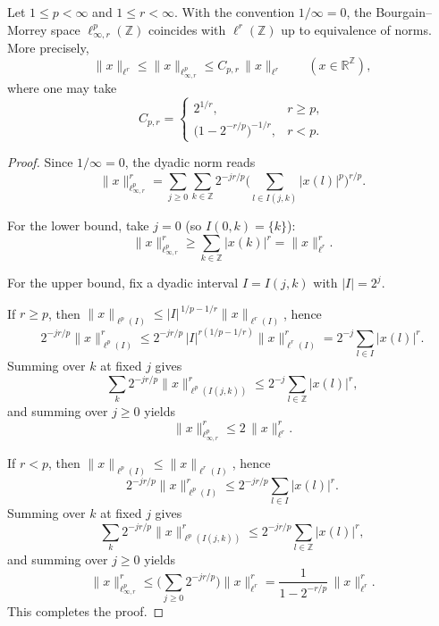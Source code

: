 \documentclass[10pt,a4paper]{amsart}
\begin{document}
\begin{proposition}[The case $q=\infty$]\label{prop:q_infty}
Let $1\le p<\infty$ and $1\le r<\infty$. With the convention $1/\infty=0$, the Bourgain--Morrey space
$\ell^{p}_{\infty,r}(\mathbb{Z})$ coincides with $\ell^{r}(\mathbb{Z})$ up to equivalence of norms. More precisely,
\[
\|x\|_{\ell^r}\le \|x\|_{\ell^{p}_{\infty,r}} \le C_{p,r}\,\|x\|_{\ell^r}
\qquad (x\in\mathbb{R}^{\mathbb{Z}}),
\]
where one may take
\[
C_{p,r}=
\begin{cases}
2^{1/r}, & r\ge p,\\[2pt]
\big(1-2^{-r/p}\big)^{-1/r}, & r<p.
\end{cases}
\]
\end{proposition}

\begin{proof}
Since $1/\infty=0$, the dyadic norm reads
\[
\|x\|_{\ell^{p}_{\infty,r}}^{r}
=\sum_{j\ge0}\sum_{k\in\mathbb Z} 2^{-jr/p}\Big(\sum_{l\in I(j,k)}|x(l)|^{p}\Big)^{r/p}.
\]

For the lower bound, take $j=0$ (so $I(0,k)=\{k\}$):
\[
\|x\|_{\ell^{p}_{\infty,r}}^{r} \ge \sum_{k\in\mathbb Z} |x(k)|^{r}=\|x\|_{\ell^r}^{r}.
\]

For the upper bound, fix a dyadic interval $I=I(j,k)$ with $|I|=2^j$.

If $r\ge p$, then $\|x\|_{\ell^p(I)}\le |I|^{\,1/p-1/r}\|x\|_{\ell^r(I)}$, hence
\[
2^{-jr/p}\|x\|_{\ell^p(I)}^{r}
\le 2^{-jr/p}\,|I|^{r(1/p-1/r)}\|x\|_{\ell^r(I)}^{r}
=2^{-j}\sum_{l\in I}|x(l)|^{r}.
\]
Summing over $k$ at fixed $j$ gives
\[
\sum_{k}2^{-jr/p}\|x\|_{\ell^p(I(j,k))}^{r}
\le 2^{-j}\sum_{l\in\mathbb Z}|x(l)|^{r},
\]
and summing over $j\ge0$ yields
\[
\|x\|_{\ell^{p}_{\infty,r}}^{r}\le2\,\|x\|_{\ell^r}^{r}.
\]

If $r<p$, then $\|x\|_{\ell^p(I)}\le \|x\|_{\ell^r(I)}$, hence
\[
2^{-jr/p}\|x\|_{\ell^p(I)}^{r}\le 2^{-jr/p}\sum_{l\in I}|x(l)|^{r}.
\]
Summing over $k$ at fixed $j$ gives
\[
\sum_{k}2^{-jr/p}\|x\|_{\ell^p(I(j,k))}^{r}\le 2^{-jr/p}\sum_{l\in\mathbb Z}|x(l)|^{r},
\]
and summing over $j\ge0$ yields
\[
\|x\|_{\ell^{p}_{\infty,r}}^{r}\le \Big(\sum_{j\ge0}2^{-jr/p}\Big)\|x\|_{\ell^r}^{r}
=\frac{1}{1-2^{-r/p}}\,\|x\|_{\ell^r}^{r}.
\]
This completes the proof.
\end{proof}
\end{document}
